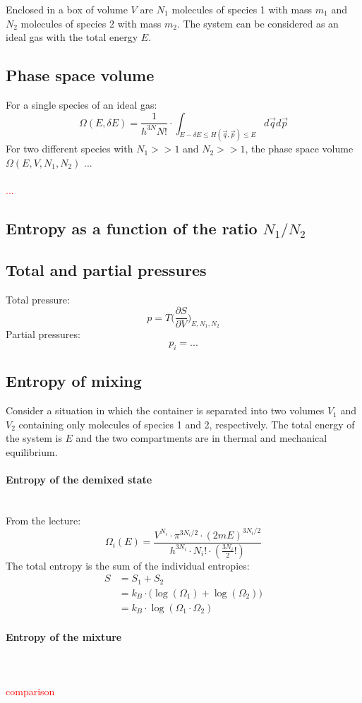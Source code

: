 Enclosed in a box of volume $V$ are $N_1$ molecules of species 1 with mass $m_1$
and $N_2$ molecules of species 2 with mass $m_2$. The system can be 
considered as an ideal gas with the total energy $E$.

\subsection{Phase space volume}
For a single species of an ideal gas:
\begin{equation}
    \Omega(E,\delta E)=\frac{1}{h^{3N}N!}\cdot
    \int_{E-\delta E\leq H(\vec q,\vec p)\leq E}
    d\vec q d\vec p
\end{equation}
For two different species with $N_1>>1$ and $N_2>>1$, 
the phase space volume $\Omega(E,V,N_1,N_2)$ ... \\
\\
\textcolor{red}{...}

\subsection{Entropy as a function of the ratio $N_1/N_2$}

\subsection{Total and partial pressures}
Total pressure:
\begin{equation}
    p=T\bigg(\frac{\partial S}{\partial V}\bigg)_{E,N_1,N_2}
\end{equation}
Partial pressures:
\begin{equation}
    p_i=...
\end{equation}

\subsection{Entropy of mixing}
Consider a situation in which the container is separated into two volumes $V_1$
and $V_2$ containing only molecules of species 1 and 2, respectively. The 
total energy of the system is $E$ and the two compartments are in thermal and 
mechanical equilibrium. 

\paragraph{Entropy of the demixed state} \ \\
From the lecture:
\begin{equation}
    \Omega_i(E)
    =\frac{V^{N_i}\cdot\pi^{3N_i/2}\cdot(2mE)^{3N_i/2}}
    {h^{3N_i}\cdot N_i!\cdot(\frac{3N_i}{2}!)}
\end{equation}
The total entropy is the sum of the individual entropies:
\begin{align}
    S&=S_1+S_2 \\
     &=k_B\cdot\bigg(\log(\Omega_1)+\log(\Omega_2)\bigg) \\
     &=k_B\cdot\log(\Omega_1\cdot\Omega_2)
\end{align}

\paragraph{Entropy of the mixture} \ \\
\\
\textcolor{red}{comparison}
